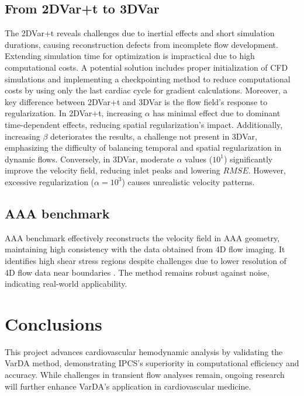 \subsection*{From 2DVar+t to 3DVar}
The 2DVar+t reveals challenges due to inertial effects and short simulation durations, causing reconstruction defects from incomplete flow development. Extending simulation time for optimization is impractical due to high computational costs. A potential solution includes proper initialization of CFD simulations and implementing a checkpointing method to reduce computational costs by using only the last cardiac cycle for gradient calculations.
Moreover, a key difference between 2DVar+t and 3DVar is the flow field's response to regularization. In 2DVar+t, increasing $\alpha$ has minimal effect due to dominant time-dependent effects, reducing spatial regularization's impact. Additionally, increasing $\beta$ deteriorates the results, a challenge not present in 3DVar, emphasizing the difficulty of balancing temporal and spatial regularization in dynamic flows. Conversely, in 3DVar, moderate $\alpha$ values ($10^{1}$) significantly improve the velocity field, reducing inlet peaks and lowering \(RMSE\). However, excessive regularization ($\alpha = 10^{3}$) causes unrealistic velocity patterns. 

\subsection*{AAA benchmark}
AAA benchmark effectively reconstructs the velocity field in AAA geometry, maintaining high consistency with the data obtained from 4D flow
imaging. It identifies high shear stress regions despite challenges due to lower resolution of 4D flow data near boundaries .
The method remains robust against noise, indicating real-world applicability. 

\section*{Conclusions}
This project advances cardiovascular hemodynamic analysis by validating the VarDA method, demonstrating IPCS's superiority in computational efficiency and accuracy. While challenges in transient flow analyses remain, ongoing research will further enhance VarDA's application in cardiovascular medicine.






